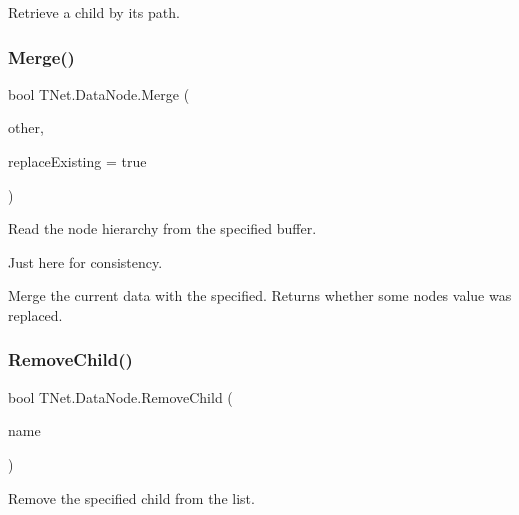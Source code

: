 Retrieve a child by its path. 

\mbox{\label{class_t_net_1_1_data_node_a4edda6eca33ee5c14a2d4d0c9d3473ad}} 
\subsubsection{\texorpdfstring{Merge()}{Merge()}}
{\footnotesize\ttfamily bool T\+Net.\+Data\+Node.\+Merge (\begin{DoxyParamCaption}\item[{\mbox{\hyperlink{class_t_net_1_1_data_node}{Data\+Node}}}]{other,  }\item[{bool}]{replace\+Existing = {\ttfamily true} }\end{DoxyParamCaption})}



Read the node hierarchy from the specified buffer. 

Just here for consistency. 

Merge the current data with the specified. Returns whether some node\textquotesingle{}s value was replaced. \mbox{\label{class_t_net_1_1_data_node_a7dc59562ed15384020ade6799fde0fcc}} 
\subsubsection{\texorpdfstring{Remove\+Child()}{RemoveChild()}}
{\footnotesize\ttfamily bool T\+Net.\+Data\+Node.\+Remove\+Child (\begin{DoxyParamCaption}\item[{string}]{name }\end{DoxyParamCaption})}



Remove the specified child from the list. 

\mbox{\label{class_t_net_1_1_data_node_ae1cef396b65b5722575952647af4eaa7}} 
